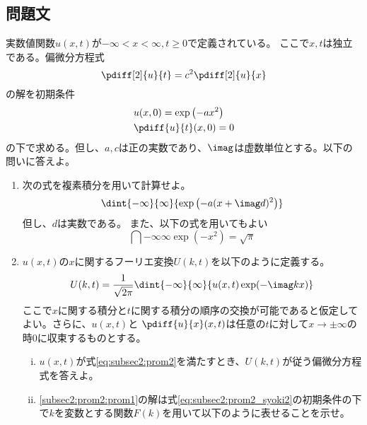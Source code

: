 \documentclass[dvipdfmx,titlepage, 11pt, a4paper]{jsarticle}%
\begin{document}
\subsection{問題文}
実数値関数$u(x, t)$が$-\infty < x < \infty, t \geq 0$で定義されている。
ここで$x, t$は独立である。偏微分方程式
\begin{equation}
    \pdiff[2]{u}{t} = c^{2}\pdiff[2]{u}{x}\label{eq:subsec2:prom2}
\end{equation}
の解を初期条件
\begin{align}
    & u(x, 0) = \exp\left(-ax^{2}\right)\label{eq:subsec2:prom2_syoki1}\\
    & \pdiff{u}{t}(x, 0) = 0\label{eq:subsec2:prom2_syoki2}
\end{align}
の下で求める。但し、$a, c$は正の実数であり、$\imag$は虚数単位とする。以下の問いに答えよ。
\begin{enumerate}[(1)]
    \setlength{\itemsep}{10pt}
    \item 次の式を複素積分を用いて計算せよ。\label{subsec2:prom1}
    \begin{equation*}
        \dint{-\infty}{\infty}{\exp\left(-a(x + \imag d)^{2}\right)}
    \end{equation*}
    但し、$d$は実数である。
    また、以下の式を用いてもよい
    \begin{equation*}
        \dint{-\infty}{\infty}{\exp\left(-x^2\right)} = \sqrt{\pi}
    \end{equation*}
    \item $u(x, t)$の$x$に関するフーリエ変換$U(k, t)$を以下のように定義する。\label{subsec2:prom2}
    \begin{equation*}
        U(k, t) = \frac{1}{\sqrt{2\pi}}\dint{-\infty}{\infty}{u(x, t)\exp(-\imag kx)}
    \end{equation*}
    ここで$x$に関する積分と$t$に関する積分の順序の交換が可能であると仮定してよい。さらに、$u(x, t)$と
    $\pdiff{u}{x}(x, t)$は任意の$t$に対して$x \rightarrow\pm\infty$の時0に収束するものとする。
    \begin{enumerate}[(i)]
        \setlength{\itemsep}{10pt}
        \item $u(x, t)$が式\eqref{eq:subsec2:prom2}を満たすとき、$U(k, t)$が従う偏微分方程式を答えよ。\label{subsec2:prom2:prom1}
        \item \eqref{subsec2:prom2:prom1}の解は式\eqref{eq:subsec2:prom2_syoki2}の初期条件の下で$k$を変数とする関数$F(k)$を用いて以下のように表せることを示せ。\label{subsec2:prom2:prom2}
        \begin{equation*}

\end{equation*}
\end{enumerate}
\end{enumerate}
\end{document}
